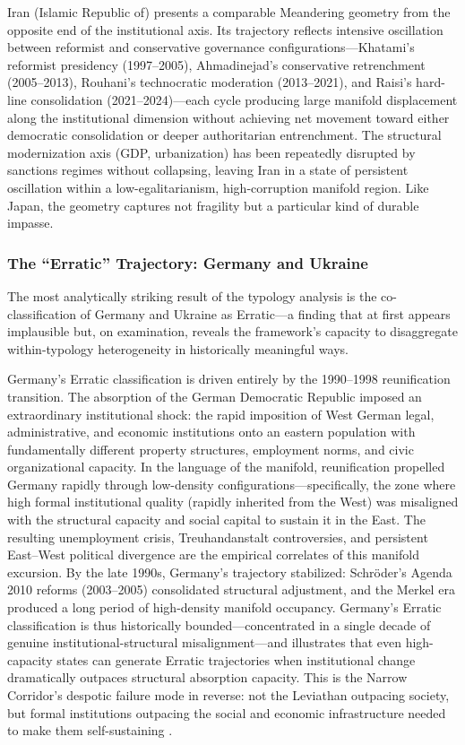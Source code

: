 \documentclass[12pt]{article}
\begin{document}
Iran (Islamic Republic of) presents a comparable Meandering geometry from the opposite end of the institutional axis. Its trajectory reflects intensive oscillation between reformist and conservative governance configurations---Khatami's reformist presidency (1997--2005), Ahmadinejad's conservative retrenchment (2005--2013), Rouhani's technocratic moderation (2013--2021), and Raisi's hard-line consolidation (2021--2024)---each cycle producing large manifold displacement along the institutional dimension without achieving net movement toward either democratic consolidation or deeper authoritarian entrenchment. The structural modernization axis (GDP, urbanization) has been repeatedly disrupted by sanctions regimes without collapsing, leaving Iran in a state of persistent oscillation within a low-egalitarianism, high-corruption manifold region. Like Japan, the geometry captures not fragility but a particular kind of durable impasse.

\subsubsection{The ``Erratic'' Trajectory: Germany and Ukraine}

The most analytically striking result of the typology analysis is the co-classification of Germany and Ukraine as Erratic---a finding that at first appears implausible but, on examination, reveals the framework's capacity to disaggregate within-typology heterogeneity in historically meaningful ways.

Germany's Erratic classification is driven entirely by the 1990--1998 reunification transition. The absorption of the German Democratic Republic imposed an extraordinary institutional shock: the rapid imposition of West German legal, administrative, and economic institutions onto an eastern population with fundamentally different property structures, employment norms, and civic organizational capacity. In the language of the manifold, reunification propelled Germany rapidly through low-density configurations---specifically, the zone where high formal institutional quality (rapidly inherited from the West) was misaligned with the structural capacity and social capital to sustain it in the East. The resulting unemployment crisis, Treuhandanstalt controversies, and persistent East--West political divergence are the empirical correlates of this manifold excursion. By the late 1990s, Germany's trajectory stabilized: Schr\"{o}der's Agenda 2010 reforms (2003--2005) consolidated structural adjustment, and the Merkel era produced a long period of high-density manifold occupancy. Germany's Erratic classification is thus historically bounded---concentrated in a single decade of genuine institutional-structural misalignment---and illustrates that even high-capacity states can generate Erratic trajectories when institutional change dramatically outpaces structural absorption capacity. This is the Narrow Corridor's despotic failure mode in reverse: not the Leviathan outpacing society, but formal institutions outpacing the social and economic infrastructure needed to make them self-sustaining \cite{acemoglu2019narrow}.
\end{document}
